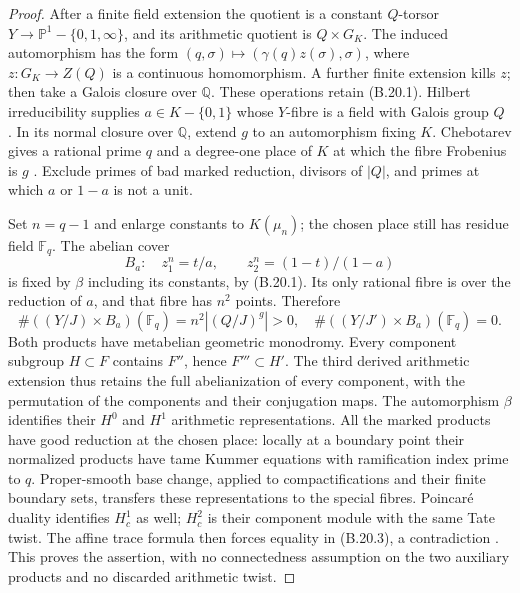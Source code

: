 \begin{proof}
After a finite field extension the quotient is a constant
$Q$-torsor $Y\to\mathbb P^1-\{0,1,\infty\}$, and its
arithmetic quotient is $Q\times G_K$. The induced automorphism
has the form $(q,\sigma)\mapsto(\gamma(q)z(\sigma),\sigma)$,
where $z:G_K\to Z(Q)$ is a continuous homomorphism. A further
finite extension kills $z$; then take a Galois closure over
$\mathbb Q$. These operations retain (B.20.1).
Hilbert irreducibility supplies $a\in K-\{0,1\}$ whose
$Y$-fibre is a field with Galois group $Q$
\cite[Proposition 3.3.1 and Theorem 3.4.1]{PBC_SerreTopics}.
In its normal closure over $\mathbb Q$, extend $g$ to an
automorphism fixing $K$. Chebotarev gives a rational prime $q$
and a degree-one place of $K$ at which the fibre Frobenius is
$g$ \cite[Chapter V, Theorem 3.23]{PBC_MilneCFT}.
Exclude primes of bad marked reduction, divisors of $|Q|$, and
primes at which $a$ or $1-a$ is not a unit.

Set $n=q-1$ and enlarge constants to $K(\mu_n)$; the chosen
place still has residue field $\mathbb F_q$. The abelian cover
\[
        B_a:\quad z_1^n=t/a,\qquad
                     z_2^n=(1-t)/(1-a)
\]
is fixed by $\beta$ including its constants, by (B.20.1).
Its only rational fibre is over the reduction of $a$, and that
fibre has $n^2$ points. Therefore
\[
 \#((Y/J)\times B_a)(\mathbb F_q)=n^2|(Q/J)^g|>0,
 \quad
 \#((Y/J')\times B_a)(\mathbb F_q)=0.
 \tag{B.20.3}
\]
Both products have metabelian geometric monodromy. Every component
subgroup $H\subset F$ contains $F''$, hence $F'''\subset H'$.
The third derived arithmetic extension thus retains the full
abelianization of every component, with the permutation of the
components and their conjugation maps. The automorphism $\beta$
identifies their $H^0$ and $H^1$ arithmetic representations.
All the marked products have good reduction at the chosen place:
locally at a boundary point their normalized products have tame
Kummer equations with ramification index prime to $q$.
Proper-smooth base change, applied to compactifications and their
finite boundary sets, transfers these representations to the
special fibres. Poincar\'e duality identifies $H_c^1$ as well;
$H_c^2$ is their component module with the same Tate twist.
The affine trace formula then forces equality in (B.20.3), a
contradiction \cite[Theorems 20.4, 24.1, 29.4]{PBC_MilneLEC}.
This proves the assertion, with no connectedness assumption on
the two auxiliary products and no discarded arithmetic twist.
\end{proof}


